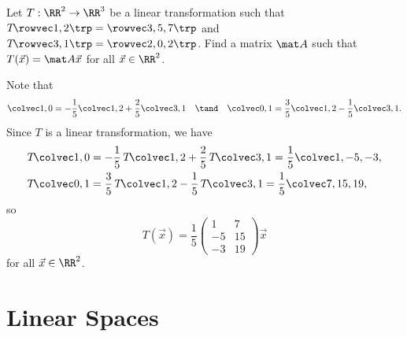 \begin{sample}
    Let $T : \RR^2 \to \RR^3$ be a linear transformation such that $T\!\cveciix12 = \cveciiix357$ and $T\!\cveciix31 = \cveciiix202$. Find a matrix $\mat A$ such that $T(\vec x) = \mat A \vec x$ for all $\vec x \in \RR^2$.
\end{sample}
\begin{solution}
    Note that \[\cvecii10 = -\frac15 \cvecii12 + \frac25 \cvecii31 \quad \tand \quad \cvecii01 = \frac35 \cvecii12 - \frac15 \cvecii31.\] Since $T$ is a linear transformation, we have
    \begin{align*}
        T\!\cvecii10 &= -\frac15 \, T\!\cvecii12 + \frac25 \, T\!\cvecii31 = \frac15 \cveciii{1}{-5}{-3},\\
        T\!\cvecii01 &= \frac35 \, T\!\cvecii12 - \frac15 \, T\!\cvecii31 = \frac15 \cveciii7{15}{19},
    \end{align*}
    so \[T(\vec x) = \frac 15 \begin{pmatrix}1 & 7 \\ -5 & 15 \\ -3 & 19\end{pmatrix} \vec x\] for all $\vec x \in \RR^2$.
\end{solution}

\section{Linear Spaces}

